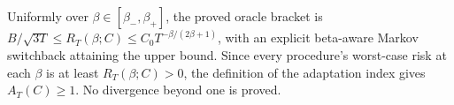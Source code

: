 Uniformly over \(\beta\in[\beta_-,\beta_+]\), the proved oracle bracket is \(B/\sqrt{3T}\le R_T(\beta;C)\le C_0T^{-\beta/(2\beta+1)}\), with an explicit beta-aware Markov switchback attaining the upper bound. Since every procedure's worst-case risk at each \(\beta\) is at least \(R_T(\beta;C)>0\), the definition of the adaptation index gives \(A_T(C)\ge1\). No divergence beyond one is proved.